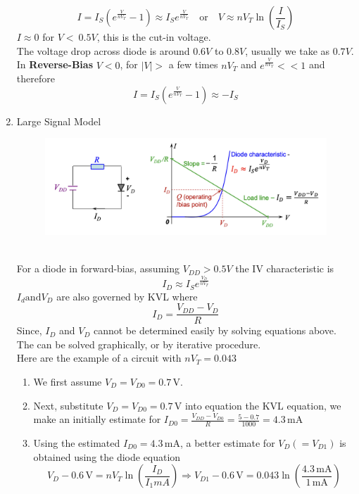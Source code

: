 \begin{enumerate}
    \[I = I_S(e^{\frac{V}{nV_T}}-1) \approx I_S e^{\frac{V}{nV_T}}\quad \text{or} \quad V\approx nV_T\ln(\frac{I}{I_S})\]
    $I \approx 0$ for $V < ~0.5V$, this is the cut-in voltage.\\
    The voltage drop across diode is around $0.6V$ to $0.8V$, usually we take as $0.7V$.\\
    In \textbf{Reverse-Bias} $V<0$, for $|V|>$ a few times $nV_T$ and $\displaystyle e^{\frac{V}{nV_T}} << 1$ and therefore
    \[I = I_S(e^{\frac{V}{nV_T}}-1) \approx -I_S\]    
    \newpage
    \item Large Signal Model
    \begin{figure}[h]
        \centering
        \includegraphics[width=1\linewidth]{image/largemodel.png}
    \end{figure} \\
    For a diode in forward-bias, assuming $\displaystyle V_{DD}>0.5V$ the IV characteristic is
    \[I_D \approx I_S e^{\frac{V_D}{nV_T}}\]
    $\displaystyle I_d \text{and} V_D$ are also governed by KVL where 
    \[I_D = \frac{V_{DD}-V_D}{R}\]
    Since, $I_D$ and $V_D$ cannot be determined easily by solving equations above. The can be solved graphically, or by iterative procedure. \\
    Here are the example of a circuit with \(nV_T = 0.043\) \\
    \begin{enumerate}
        \item We first assume \( V_D = V_{D0} = 0.7 \, \text{V} \).
        \item Next, substitute \( V_D = V_{D0} = 0.7 \, \text{V} \) into equation the KVL equation, we make an initially estimate for \(I_{D0} = \frac{V_{DD} - V_{D0}}{R} = \frac{5 - 0.7}{1000} = 4.3 \, \text{mA} \)
        \item Using the estimated \( I_{D0} = 4.3 \, \text{mA} \), a better estimate for \( V_D ( = V_{D1} ) \) is obtained using the diode equation
        \[ V_D - 0.6 \, \text{V} = nV_T \ln(\frac{I_D}{I_{1} mA}) \Rightarrow V_{D1} - 0.6 \, \text{V} = 0.043 \ln(\frac{4.3 \, \text{mA}}{1 \, \text{mA}}) \]

\end{enumerate}
\end{enumerate}
